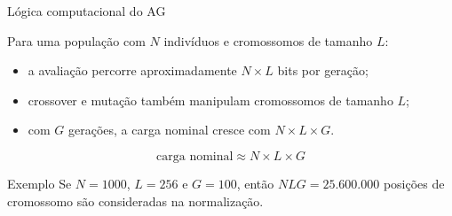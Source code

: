 \documentclass[aspectratio=169,11pt]{beamer}
\begin{document}

\begin{frame}{Lógica computacional do AG}

    \vspace{0.05cm}

    Para uma população com $N$ indivíduos e cromossomos de tamanho $L$:

    \vspace{0.15cm}

    \begin{itemize}
        \item a avaliação percorre aproximadamente $N \times L$ bits por geração;
        \item crossover e mutação também manipulam cromossomos de tamanho $L$;
        \item com $G$ gerações, a carga nominal cresce com $N \times L \times G$.
    \end{itemize}

    \vspace{0.12cm}

    \[
        \text{carga nominal} \approx N \times L \times G
    \]

    \vspace{0.02cm}

    \begin{questionbox}{Exemplo}
        Se $N=1000$, $L=256$ e $G=100$, então
        $NLG = 25.600.000$ posições de cromossomo são consideradas
        na normalização.
    \end{questionbox}

\end{frame}

\end{document}
